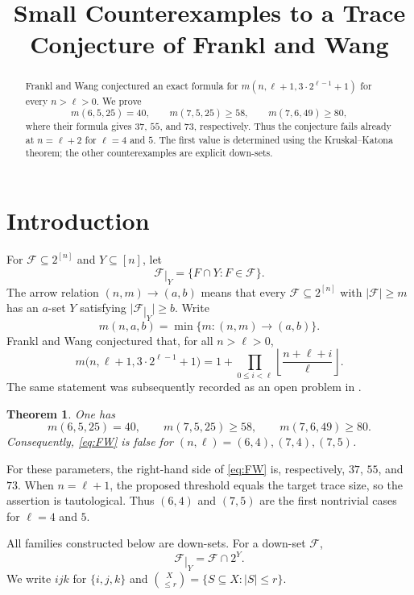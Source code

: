 \documentclass[11pt]{amsart}
\title[Small counterexamples to a trace conjecture]
{Small Counterexamples to a Trace Conjecture of Frankl and Wang}
\date{}
\newtheorem{theorem}{Theorem}
\newcommand{\tr}{\mathbin{|}}
\newcommand{\cF}{\mathcal F}
\begin{document}
\begin{abstract}
Frankl and Wang conjectured an exact formula for
$m(n,\ell+1,3\cdot2^{\ell-1}+1)$ for every $n>\ell>0$.
We prove
\[
  m(6,5,25)=40,\qquad m(7,5,25)\ge58,\qquad
  m(7,6,49)\ge80,
\]
where their formula gives $37$, $55$, and $73$, respectively.
Thus the conjecture fails already at $n=\ell+2$ for $\ell=4$ and $5$.
The first value is determined using the Kruskal--Katona theorem; the
other counterexamples are explicit down-sets.
\end{abstract}

\maketitle

\section{Introduction}

For $\cF\subseteq2^{[n]}$ and $Y\subseteq[n]$, let
\[
  \cF\tr_Y=\{F\cap Y:F\in\cF\}.
\]
The arrow relation $(n,m)\to(a,b)$ means that every
$\cF\subseteq2^{[n]}$ with $|\cF|\ge m$ has an $a$-set $Y$ satisfying
$|\cF\tr_Y|\ge b$. Write
\[
  m(n,a,b)=\min\{m:(n,m)\to(a,b)\}.
\]
Frankl and Wang conjectured \cite[Conjecture~1.3]{FW} that, for all
$n>\ell>0$,
\begin{equation}\label{eq:FW}
  m\bigl(n,\ell+1,3\cdot2^{\ell-1}+1\bigr)
  =1+\prod_{0\le i<\ell}
  \left\lfloor\frac{n+\ell+i}{\ell}\right\rfloor.
\end{equation}
The same statement was subsequently recorded as an open problem in
\cite[Conjecture~2]{LMR}.

\begin{theorem}\label{thm:main}
One has
\[
  m(6,5,25)=40,\qquad m(7,5,25)\ge58,
  \qquad m(7,6,49)\ge80.
\]
Consequently, \eqref{eq:FW} is false for
$(n,\ell)=(6,4),(7,4),(7,5)$.
\end{theorem}

For these parameters, the right-hand side of \eqref{eq:FW} is,
respectively, $37$, $55$, and $73$. When $n=\ell+1$, the proposed
threshold equals the target trace size, so the assertion is tautological.
Thus $(6,4)$ and $(7,5)$ are the first nontrivial cases for $\ell=4$
and $5$.

All families constructed below are down-sets. For a down-set $\cF$,
\begin{equation}\label{eq:downtrace}
  \cF\tr_Y=\cF\cap2^Y.
\end{equation}
We write $ijk$ for $\{i,j,k\}$ and
$\binom{X}{\le r}=\{S\subseteq X:|S|\le r\}$.
\end{document}
